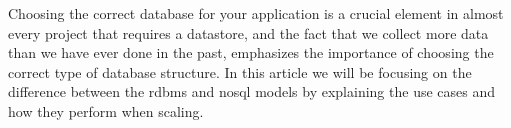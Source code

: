 Choosing the correct database for your application is a crucial element in almost every project that requires a datastore, and the fact that we collect more data than we have ever done in the past, emphasizes the importance of choosing the correct type of database structure.
In this article we will be focusing on the difference between the rdbms and nosql models by explaining the use cases and how they perform when scaling. 
